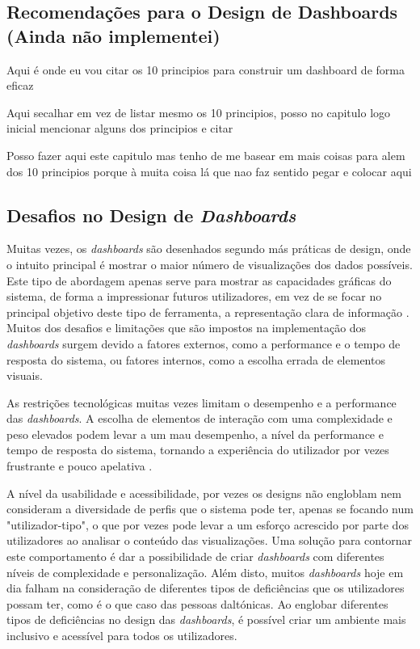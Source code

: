 \subsection{Recomendações para o Design de Dashboards (Ainda não implementei)} %
\label{sub:recomendacoes}

Aqui é onde eu vou citar os 10 principios para construir um dashboard de forma eficaz

Aqui secalhar em vez de listar mesmo os 10 principios, posso no capitulo logo inicial mencionar alguns dos principios e citar

Posso fazer aqui este capitulo mas tenho de me basear em mais coisas para alem dos 10 principios porque à muita coisa lá que nao faz sentido pegar e colocar aqui

\subsection{Desafios no Design de \textit{Dashboards}}
\label{sec:desafios_design}

Muitas vezes, os \textit{dashboards} são desenhados segundo más práticas de design, onde o intuito principal é mostrar o maior número de visualizações dos dados possíveis. Este tipo de abordagem apenas serve para mostrar as capacidades gráficas do sistema, de forma a impressionar futuros utilizadores, em vez de se focar no principal objetivo deste tipo de ferramenta, a representação clara de informação \cite{janes2013effective}. Muitos dos desafios e limitações que são impostos na implementação dos \textit{dashboards} surgem devido a fatores externos, como a performance e o tempo de resposta do sistema, ou fatores internos, como a escolha errada de elementos visuais. 

As restrições tecnológicas muitas vezes limitam o desempenho e a performance das \textit{dashboards}. A escolha de elementos de interação com uma complexidade e peso elevados podem levar a um mau desempenho, a nível da performance e tempo de resposta do sistema, tornando a experiência do utilizador por vezes frustrante e pouco apelativa \cite{eckerson2010performance}. 

A nível da usabilidade e acessibilidade, por vezes os designs não engloblam nem consideram a diversidade de perfis que o sistema pode ter, apenas se focando num "utilizador-tipo", o que por vezes pode levar a um esforço acrescido por parte dos utilizadores ao analisar o conteúdo das visualizações. Uma solução para contornar este comportamento é dar a possibilidade de criar \textit{dashboards} com diferentes níveis de complexidade e personalização. Além disto, muitos \textit{dashboards} hoje em dia falham na consideração de diferentes tipos de deficiências que os utilizadores possam ter, como é o que caso das pessoas daltónicas. Ao englobar diferentes tipos de deficiências no design das \textit{dashboards}, é possível criar um ambiente mais inclusivo e acessível para todos os utilizadores.


